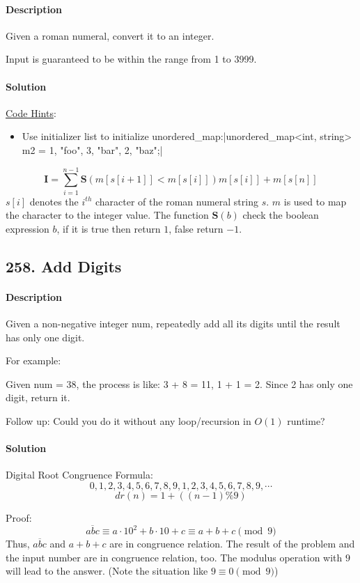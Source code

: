 \paragraph{Description}

Given a roman numeral, convert it to an integer.

Input is guaranteed to be within the range from 1 to 3999.

\paragraph{Solution}
\underline{Code Hints}:
\begin{itemize}
    \item Use initializer list to initialize unordered\_map:|unordered_map<int, string> m2 = {{1, "foo"}, {3, "bar"}, {2, "baz"}};|
\end{itemize}

$$\bm{I}=\sum^{n-1}_{i=1}{\bm{S}(m[s[i+1]]<m[s[i]])m[s[i]]}+m[s[n]]$$
$s[i]$ denotes the $i^{th}$ character of the roman numeral string $s$. $m$ is used to map the character to the integer value. The function $\bm{S}(b)$ check the boolean expression $b$, if it is true then return $1$, false return $-1$. 

\subsection{258. Add Digits}

\paragraph{Description}

Given a non-negative integer num, repeatedly add all its digits until the result has only one digit.

For example:

Given num = 38, the process is like: 3 + 8 = 11, 1 + 1 = 2. Since 2 has only one digit, return it.

Follow up:
Could you do it without any loop/recursion in $O(1)$ runtime?

\paragraph{Solution}

Digital Root Congruence Formula:
$$0, 1, 2, 3, 4, 5, 6, 7, 8, 9, 1, 2, 3, 4, 5, 6, 7, 8, 9,\cdots$$
$$dr(n)=1+((n - 1) \% 9)$$

Proof:
$$\overline{abc}\equiv a\cdot 10^2+b\cdot 10+c\equiv a+b+c \pmod{9}$$
Thus, $\overline{abc}$ and $a+b+c$ are in congruence relation. The result of the problem and the input number are in congruence relation, too. The modulus operation with $9$ will lead to the answer. (Note the situation like $9\equiv 0\pmod{9}$)